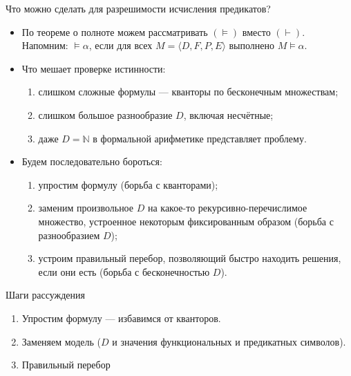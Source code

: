 \documentclass[aspectratio=169]{beamer}
\begin{document}
\begin{frame}{Что можно сделать для разрешимости исчисления предикатов?}
\begin{itemize}
\item По теореме о полноте можем рассматривать $(\models)$ вместо $(\vdash)$. 
Напомним: $\models \alpha$, если для всех $M = \langle D, F, P, E \rangle$ выполнено $M \models \alpha$.\pause
\vspace{0.3cm}

\item Что мешает проверке истинности:
\begin{enumerate}
\item слишком сложные формулы --- кванторы по бесконечным множествам;
\item слишком большое разнообразие $D$, включая несчётные;
\item даже $D = \mathbb{N}$ в формальной арифметике представляет проблему.
\end{enumerate}\pause
\vspace{0.3cm}

\item Будем последовательно бороться:
\begin{enumerate}
\item упростим формулу (борьба с кванторами);
\item заменим произвольное $D$ на какое-то рекурсивно-перечислимое множество, устроенное некоторым фиксированным образом (борьба с разнообразием $D$);
\item устроим правильный перебор, позволяющий быстро находить решения, если они есть (борьба с бесконечностью $D$).
\end{enumerate}
\end{itemize}
\end{frame}

\begin{frame}{Шаги рассуждения}
\begin{enumerate}
\item \color{black}Упростим формулу --- избавимся от кванторов.
\item \color{gray}Заменяем модель ($D$ и значения функциональных и предикатных символов).
\item \color{gray}Правильный перебор
\end{enumerate}
\end{frame}
\end{document}
